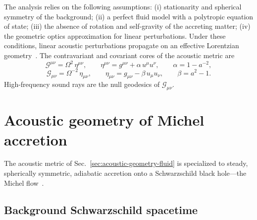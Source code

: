 \documentclass[12pt,a4paper,preprint]{elsarticle}
\begin{document}
            The analysis relies on the following assumptions: (i) stationarity and spherical symmetry of the background; (ii) a perfect fluid model with a polytropic equation of state; (iii) the absence of rotation and self-gravity of the accreting matter; (iv) the geometric optics approximation for linear perturbations. Under these conditions, linear acoustic perturbations propagate on an effective Lorentzian geometry~\cite{BilicN_RelativisticAcousticGeometry_1999, VisserM_AcousticBlackHolesHorizonsErgospheresAndHawkingRadiation_1998, BarceloC_LiberatiS_VisserM_AnalogueGravity_2011}. The contravariant and covariant cores of the acoustic metric are
            \begin{equation}
                \mathcal{G}^{\mu\nu} = \Omega^{2}\,\eta^{\mu\nu} , \qquad \eta^{\mu\nu} = g^{\mu\nu} + \alpha\, u^{\mu} u^{\nu} , \qquad \alpha = 1 - a^{-2} ,
                \label{eq:acoustic-metric-tensor}
            \end{equation}
            \begin{equation}
                \mathcal{G}_{\mu\nu} = \Omega^{-2}\,\eta_{\mu\nu} , \qquad \eta_{\mu\nu} = g_{\mu\nu} - \beta\, u_{\mu} u_{\nu} , \qquad \beta = a^{2} - 1 .
                \label{eq:covariant-acoustic-metric-tensor}
            \end{equation}
            High-frequency sound rays are the null geodesics of $\mathcal{G}_{\mu\nu}$.

    \section{Acoustic geometry of Michel accretion}\label{sec:acoustic-geometry}

        The acoustic metric of Sec.~\ref{sec:acoustic-geometry-fluid} is specialized to steady, spherically symmetric, adiabatic accretion onto a Schwarzschild black hole---the Michel flow~\cite{MichelFC_AccretionOfMatterByCondensedObjects_1972}.

        \subsection{Background Schwarzschild spacetime}\label{subsec:schwarzschild-background}
\end{document}
